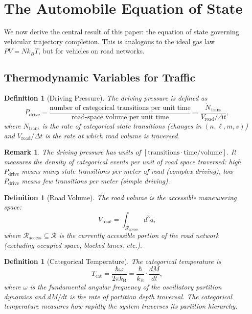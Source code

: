 \documentclass[twocolumn,10pt]{article}
\newtheorem{definition}[theorem]{Definition}
\newtheorem{remark}[theorem]{Remark}
\newcommand{\kB}{k_{\mathrm{B}}}
\newcommand{\Tcat}{T_{\mathrm{cat}}}
\newcommand{\Pdrive}{P_{\mathrm{drive}}}
\newcommand{\Vroad}{V_{\mathrm{road}}}
\begin{document}
\section{The Automobile Equation of State}\label{sec:eos}

We now derive the central result of this paper: the equation of state governing vehicular trajectory completion. This is analogous to the ideal gas law $PV = Nk_BT$, but for vehicles on road networks.

\subsection{Thermodynamic Variables for Traffic}

\begin{definition}[Driving Pressure]\label{def:pressure}
The driving pressure is defined as
\begin{equation}\label{eq:pressure}
\Pdrive = \frac{\text{number of categorical transitions per unit time}}{\text{road-space volume per unit time}} = \frac{\dot{N}_{\mathrm{trans}}}{\Vroad / \Delta t},
\end{equation}
where $\dot{N}_{\mathrm{trans}}$ is the rate of categorical state transitions (changes in $(n, \ell, m, s)$) and $\Vroad / \Delta t$ is the rate at which road volume is traversed.
\end{definition}

\begin{remark}
The driving pressure has units of $[\text{transitions} \cdot \text{time} / \text{volume}]$. It measures the density of categorical events per unit of road space traversed: high $\Pdrive$ means many state transitions per meter of road (complex driving), low $\Pdrive$ means few transitions per meter (simple driving).
\end{remark}

\begin{definition}[Road Volume]\label{def:roadvolume}
The road volume is the accessible maneuvering space:
\begin{equation}\label{eq:roadvolume}
\Vroad = \int_{\mathcal{R}_{\mathrm{access}}} d^3q,
\end{equation}
where $\mathcal{R}_{\mathrm{access}} \subseteq \mathcal{R}$ is the currently accessible portion of the road network (excluding occupied space, blocked lanes, etc.).
\end{definition}

\begin{definition}[Categorical Temperature]\label{def:temperature}
The categorical temperature is
\begin{equation}\label{eq:temperature}
\Tcat = \frac{\hbar \omega}{2\pi \kB} = \frac{\hbar}{\kB} \cdot \frac{dM}{dt},
\end{equation}
where $\omega$ is the fundamental angular frequency of the oscillatory partition dynamics and $dM/dt$ is the rate of partition depth traversal. The categorical temperature measures how rapidly the system traverses its partition hierarchy.
\end{definition}
\end{document}
